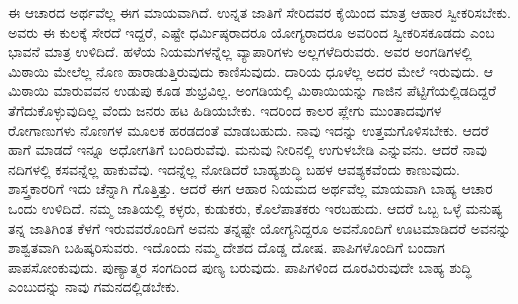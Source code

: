 ಈ ಆಚಾರದ ಅರ್ಥವೆಲ್ಲ ಈಗ ಮಾಯವಾಗಿದೆ. ಉನ್ನತ ಜಾತಿಗೆ ಸೇರಿದವರ ಕೈಯಿಂದ ಮಾತ್ರ ಆಹಾರ ಸ್ವೀಕರಿಸಬೇಕು. ಅವರು ಈ ಕುಲಕ್ಕೆ ಸೇರದೆ ಇದ್ದರೆ, ಎಷ್ಟೇ ಧರ್ಮಿಷ್ಠರಾದರೂ ಯೋಗ್ಯರಾದರೂ ಅವರಿಂದ ಸ್ವೀಕರಿಸಕೂಡದು ಎಂಬ ಭಾವನೆ ಮಾತ್ರ ಉಳಿದಿದೆ. ಹಳೆಯ ನಿಯಮಗಳನ್ನೆಲ್ಲ ವ್ಯಾಪಾರಿಗಳು ಅಲ್ಲಗಳೆದಿರುವರು. ಅವರ ಅಂಗಡಿಗಳಲ್ಲಿ ಮಿಠಾಯಿ ಮೇಲೆಲ್ಲ ನೊಣ ಹಾರಾಡುತ್ತಿರುವುದು ಕಾಣಿಸುವುದು. ದಾರಿಯ ಧೂಳೆಲ್ಲ ಅದರ ಮೇಲೆ ಇರುವುದು. ಆ ಮಿಠಾಯಿ ಮಾರುವವನ ಉಡುಪು ಕೂಡ ಶುಭ್ರವಿಲ್ಲ. ಅಂಗಡಿಯಲ್ಲಿ ಮಿಠಾಯಿಯನ್ನು ಗಾಜಿನ ಪೆಟ್ಟಿಗೆಯಲ್ಲಿಡದಿದ್ದರೆ ತೆಗೆದುಕೊಳ್ಳುವುದಿಲ್ಲ ವೆಂದು ಜನರು ಹಟ ಹಿಡಿಯಬೇಕು. ಇದರಿಂದ ಕಾಲರ ಪ್ಲೇಗು ಮುಂತಾದವುಗಳ ರೋಗಾಣುಗಳು ನೊಣಗಳ ಮೂಲಕ ಹರಡದಂತೆ ಮಾಡಬಹುದು. ನಾವು ಇದನ್ನು ಉತ್ತಮಗೊಳಿಸಬೇಕು. ಆದರೆ ಹಾಗೆ ಮಾಡದೆ ಇನ್ನೂ ಅಧೋಗತಿಗೆ ಬಂದಿರುವೆವು. ಮನುವು ನೀರಿನಲ್ಲಿ ಉಗುಳಬೇಡಿ ಎನ್ನುವನು. ಆದರೆ ನಾವು ನದಿಗಳಲ್ಲಿ ಕಸವನ್ನೆಲ್ಲ ಹಾಕುವೆವು. ಇದನ್ನೆಲ್ಲ ನೋಡಿದರೆ ಬಾಹ್ಯಶುದ್ಧಿ ಬಹಳ ಆವಶ್ಯಕವೆಂದು ಕಾಣುವುದು. ಶಾಸ್ತ್ರಕಾರರಿಗೆ ಇದು ಚೆನ್ನಾಗಿ ಗೊತ್ತಿತ್ತು. ಆದರೆ ಈಗ ಆಹಾರ ನಿಯಮದ ಅರ್ಥವೆಲ್ಲ ಮಾಯವಾಗಿ ಬಾಹ್ಯ ಆಚಾರ ಒಂದು ಉಳಿದಿದೆ. ನಮ್ಮ ಜಾತಿಯಲ್ಲಿ ಕಳ್ಳರು, ಕುಡುಕರು, ಕೊಲೆಪಾತಕರು ಇರಬಹುದು. ಆದರೆ ಒಬ್ಬ ಒಳ್ಳೆ ಮನುಷ್ಯ ತನ್ನ ಜಾತಿಗಿಂತ ಕೆಳಗೆ ಇರುವವರೊಂದಿಗೆ ಅವನು ತನ್ನಷ್ಟೇ ಯೋಗ್ಯನಿದ್ದರೂ ಅವನೊಂದಿಗೆ ಊಟಮಾಡಿದರೆ ಅವನನ್ನು ಶಾಶ್ವತವಾಗಿ ಬಹಿಷ್ಕರಿಸುವರು. ಇದೊಂದು ನಮ್ಮ ದೇಶದ ದೊಡ್ಡ ದೋಷ. ಪಾಪಿಗಳೊಂದಿಗೆ ಬಂದಾಗ ಪಾಪಸೋಂಕುವುದು. ಪುಣ್ಯಾತ್ಮರ ಸಂಗದಿಂದ ಪುಣ್ಯ ಬರುವುದು. ಪಾಪಿಗಳಿಂದ ದೂರವಿರುವುದೇ ಬಾಹ್ಯ ಶುದ್ಧಿ ಎಂಬುದನ್ನು ನಾವು ಗಮನದಲ್ಲಿಡಬೇಕು.

\vskip 0.2cm

